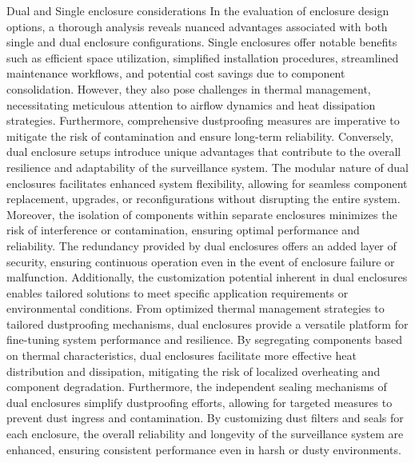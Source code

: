 
Dual and Single enclosure considerations
In the evaluation of enclosure design options, a thorough analysis reveals nuanced advantages associated with both single and dual enclosure configurations. Single enclosures offer notable benefits such as efficient space utilization, simplified installation procedures, streamlined maintenance workflows, and potential cost savings due to component consolidation. However, they also pose challenges in thermal management, necessitating meticulous attention to airflow dynamics and heat dissipation strategies. Furthermore, comprehensive dustproofing measures are imperative to mitigate the risk of contamination and ensure long-term reliability.
Conversely, dual enclosure setups introduce unique advantages that contribute to the overall resilience and adaptability of the surveillance system. The modular nature of dual enclosures facilitates enhanced system flexibility, allowing for seamless component replacement, upgrades, or reconfigurations without disrupting the entire system. Moreover, the isolation of components within separate enclosures minimizes the risk of interference or contamination, ensuring optimal performance and reliability. The redundancy provided by dual enclosures offers an added layer of security, ensuring continuous operation even in the event of enclosure failure or malfunction.
Additionally, the customization potential inherent in dual enclosures enables tailored solutions to meet specific application requirements or environmental conditions. From optimized thermal management strategies to tailored dustproofing mechanisms, dual enclosures provide a versatile platform for fine-tuning system performance and resilience. By segregating components based on thermal characteristics, dual enclosures facilitate more effective heat distribution and dissipation, mitigating the risk of localized overheating and component degradation.
Furthermore, the independent sealing mechanisms of dual enclosures simplify dustproofing efforts, allowing for targeted measures to prevent dust ingress and contamination. By customizing dust filters and seals for each enclosure, the overall reliability and longevity of the surveillance system are enhanced, ensuring consistent performance even in harsh or dusty environments.

